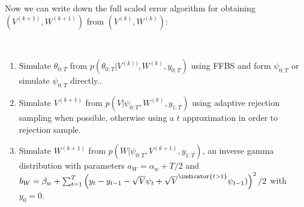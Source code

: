 Now we can write down the full scaled error algorithm for obtaining $(V^{(k+1)},W^{(k+1)})$ from $(V^{(k)},W^{(k)})$:
\begin{alg}\mbox{}\\[-\baselineskip]
\begin{enumerate}\label{erroralg}
\item Simulate $\theta_{0:T}$ from $p(\theta_{0:T}|V^{(k))},W^{(k)},y_{0:T})$
  using FFBS and form $\psi_{0:T}$ or simulate $\psi_{0:T}$ directly..
\item Simulate $V^{(k+1)}$ from $p(V|\psi_{0:T},W^{(k)},y_{1:T})$ using adaptive rejection sampling when possible, otherwise using a $t$ approximation in order to rejection sample.
\item Simulate $W^{(k+1)}$ from $p(W|\psi_{0:T},V^{(k+1)},y_{1:T})$, an inverse gamma distribution with parameters $a_W = \alpha_w + T/2$ and $b_W = \beta_w + \sum_{t=1}^T\left(y_t- y_{t-1} - \sqrt{V}\psi_t + \sqrt{V}^{\indicator{t>1}}\psi_{t-1})\right)^2/2$ with $y_0=0$.
\end{enumerate}
\end{alg}
